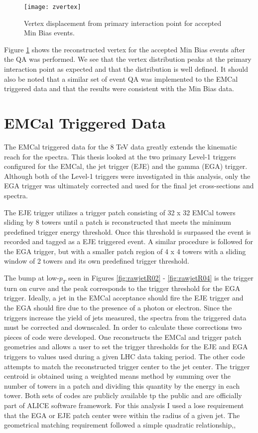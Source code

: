 \begin{figure}[h]
\texttt{[image: zvertex]}
\centering
\caption{Vertex displacement from primary interaction point for accepted Min Bias events.}
\label{fig:vertrec}
\end{figure}


Figure \ref{fig:vertrec} shows the reconstructed vertex for the accepted Min Bias events after the QA was performed.  We see that the vertex distribution peaks at the primary interaction point as expected and that the distribution is well defined.  It should also be noted that a similar set of event QA was implemented to the EMCal triggered data and that the results were consistent with the Min Bias data.


\section{EMCal Triggered Data}

The EMCal triggered data for the 8 TeV data greatly extends the kinematic reach for the spectra.  This thesis looked at the two primary Level-1 triggers configured for the EMCal, the jet trigger (EJE) and the gamma (EGA) trigger\cite{Bourrion:2010js}.  Although both of the Level-1 triggers were investigated in this analysis, only the EGA trigger was ultimately corrected  and used for the final jet cross-sections and spectra.  

The EJE trigger utilizes a trigger patch consisting of 32 x 32 EMCal towers sliding by 8 towers until a patch is reconstructed that meets the minimum predefined trigger energy threshold.  Once this threshold is surpassed the event is recorded and tagged as a EJE triggered event.  A similar procedure is followed for the EGA trigger, but with a smaller patch region of 4 x 4 towers with a sliding window of 2 towers and its own predefined trigger threshold.  

The bump at low-$p_{T}$ seen in Figures \ref{fig:rawjetR02} - \ref{fig:rawjetR04} is the trigger turn on curve and the peak corresponds to the trigger threshold for the EGA trigger.  Ideally, a jet in the EMCal acceptance should fire the EJE trigger and the EGA should fire due to the presence of a photon or electron.  Since the triggers increase the yield of jets measured, the spectra from the triggered data must be corrected and downscaled.  In order to calculate these corrections two pieces of code were developed.  One reconstructs the EMCal and trigger patch geometries and allows a user to set the trigger thresholds for the EJE and EGA triggers to values used during a given LHC data taking period.  The other code attempts to match the reconstructed trigger center to the jet center.  The trigger centroid is obtained using a weighted means method by summing over the number of towers in a patch and dividing this quantity by the energy in each tower.  Both sets of codes are publicly available tp the public and are officially part of ALICE software framework.  For this analysis I used a lose requirement that the EGA or EJE patch center were within the radius of a given jet.  The geometrical matching requirement followed a simple quadratic relationship,,

